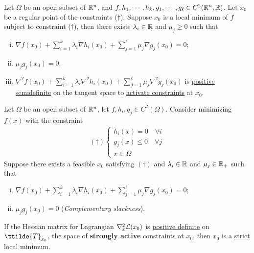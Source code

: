 \documentclass{article}
\begin{document}
    \begin{theorem}
        Let $\Omega$ be an open subset of $\mathbb{R}^n$, and $f, h_1, \cdots, h_k, g_1, \cdots, g_\ell \in C^2(\mathbb{R}^n, \mathbb{R})$. Let $x_0$ be a regular point of the constraints ($\dag$).
        Suppose $x_0$ is a local minimum of $f$ subject to constraint ($\dag$), then there exists $\lambda_i \in \mathbb{R}$ and $\mu_j \geq 0$ such that
        \begin{enumerate}[(i)]
            \item $\nabla f(x_0) + \sum_{i=1}^k \lambda_i \nabla h_i(x_0) + \sum_{j=1}^\ell \mu_j \nabla g_j(x_0) = 0$;
            \item $\mu_j g_j(x_0) = 0$;
            \item $\nabla^2 f(x_0) + \sum_{i=1}^k \lambda_i \nabla^2 h_i(x_0) + \sum_{j=1}^\ell \mu_j \nabla^2 g_j(x_0)$ is \ul{positive semidefinite} on the tangent space to \ul{activate constraints} at $x_0$.
        \end{enumerate}
    \end{theorem}

    \begin{theorem}
        Let $\Omega$ be an open subset of $\mathbb{R}^n$, let $f, h_i, q_j \in C^2(\Omega)$. Consider minimizing $f(x)$ with the constraint
        \begin{align}
            (\dag ) \begin{cases}
                h_i(x) = 0\quad \forall i \\
                g_j(x) \leq 0\quad \forall j \\
                x \in \Omega
            \end{cases}
        \end{align}
        Suppose there exists a feasible $x_0$ satisfying $(\dag)$ and $\lambda_i \in \mathbb{R}$ and $\mu_j \in \mathbb{R}_{+}$ such that
        \begin{enumerate}[(i)]
            \item $\nabla f(x_0) + \sum_{i=1}^k \lambda_i \nabla h_i(x_0) + \sum_{j=1}^\ell \mu_j \nabla g_j(x_0) = 0$;
            \item $\mu_j g_j(x_0) = 0$ (\emph{Complementary slackness}).
        \end{enumerate}
        If the Hessian matrix for Lagrangian $\nabla_x^2 \mathcal{{L}}(x_0)$ is \ul{positive definite} on $\ttilde{T}_{x_0}$, the space of \textbf{strongly active} constraints at $x_0$, then $x_0$ is a \ul{strict} local minimum.
    \end{theorem}
\end{document}
